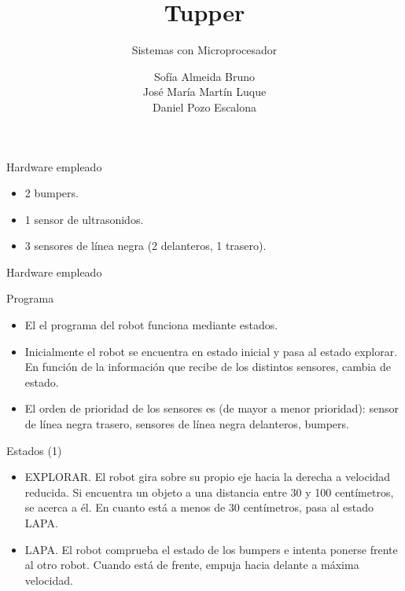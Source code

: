 \documentclass[spanish]{beamer}
\title{Tupper}
\subtitle{Sistemas con Microprocesador}
\author{Sofía Almeida Bruno\\ José María Martín Luque\\Daniel Pozo Escalona\\ \vspace{1em}}
\begin{document}
\maketitle

\begin{frame}{Hardware empleado}
  \begin{itemize}
    \item 2 bumpers.
    \item 1 sensor de ultrasonidos.
    \item 3 sensores de línea negra (2 delanteros, 1 trasero).
  \end{itemize}
\end{frame}

\begin{frame}{Hardware empleado}
  \begin{center}
    \begin{tikzpicture}
    \end{tikzpicture}
  \end{center}
\end{frame}

\begin{frame}{Programa}
  \begin{itemize}
    \item El el programa del robot funciona mediante estados.
    \item Inicialmente el robot se encuentra en estado inicial y pasa al estado explorar. En función de la información que recibe de los distintos sensores, cambia de estado.
    \item El orden de prioridad de los sensores es (de mayor a menor prioridad): sensor de línea negra trasero, sensores de línea negra delanteros, bumpers. 
  \end{itemize}
\end{frame}

\begin{frame}{Estados (1)}
  \begin{itemize}
    \item EXPLORAR. El robot gira sobre su propio eje hacia la derecha a velocidad reducida. Si encuentra un objeto a una distancia entre 30 y 100 centímetros, se acerca a él. En cuanto está a menos de 30 centímetros, pasa al estado LAPA.
    \item LAPA. El robot comprueba el estado de los bumpers e intenta ponerse frente al otro robot. Cuando está de frente, empuja hacia delante a máxima velocidad.
  \end{itemize}
\end{frame}
\end{document}

